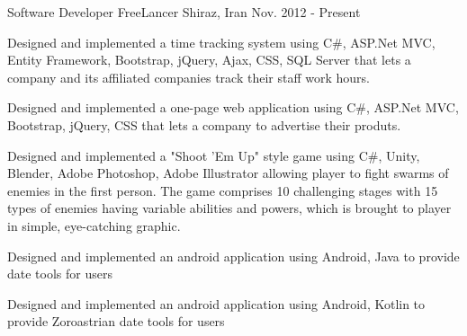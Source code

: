 


\begin{cventries}


\cventry
{Software Developer} %
{FreeLancer} %
{Shiraz, Iran} %
{Nov. 2012 - Present} %
{ %
\begin{cvitems}
\item {Designed and implemented a time tracking system using C\#, ASP.Net MVC, Entity Framework, Bootstrap, jQuery, Ajax, CSS, SQL Server that lets a company and its affiliated companies track their staff work hours.}
\item {Designed and implemented a one-page web application using C\#, ASP.Net MVC, Bootstrap, jQuery, CSS that lets a company to advertise their produts.}
\item {Designed and implemented a "Shoot 'Em Up" style game using C\#, Unity, Blender, Adobe Photoshop, Adobe Illustrator allowing player to fight swarms of enemies in the first person. The game comprises 10 challenging stages with 15 types of enemies having variable abilities and powers, which is brought to player in simple, eye-catching graphic.}
\item {Designed and implemented an android application using Android, Java to provide date tools for users}
\item {Designed and implemented an android application using Android, Kotlin to provide Zoroastrian date tools for users}
\end{cvitems}
}


\end{cventries}